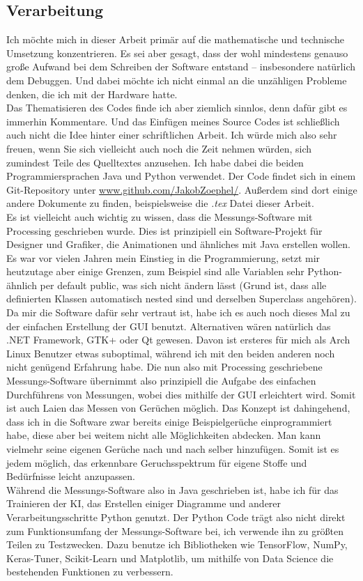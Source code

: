\documentclass[10pt]{article}
\begin{document}
\subsection{Verarbeitung}
Ich möchte mich in dieser Arbeit primär auf die mathematische und technische Umsetzung konzentrieren. Es sei aber gesagt,
dass der wohl mindestens genauso große Aufwand bei dem Schreiben der Software entstand – insbesondere natürlich dem Debuggen. 
Und dabei möchte ich nicht einmal an die unzähligen Probleme denken, die ich mit der Hardware hatte.\\
Das Thematisieren des Codes finde ich aber ziemlich sinnlos, denn dafür gibt es immerhin Kommentare. Und das Einfügen meines Source Codes ist schließlich auch
nicht die Idee hinter einer schriftlichen Arbeit. Ich würde mich also sehr freuen, wenn Sie sich vielleicht auch noch die Zeit nehmen würden, sich zumindest Teile des Quelltextes anzusehen.
Ich habe dabei die beiden Programmiersprachen Java und Python verwendet. Der Code findet sich in einem Git-Repository unter \url{www.github.com/JakobZoephel/}.
Außerdem sind dort einige andere Dokumente zu finden, beispielsweise die \textit{.tex} Datei dieser Arbeit.\\
Es ist vielleicht auch wichtig zu wissen, dass die Messungs-Software mit Processing geschrieben wurde. Dies ist prinzipiell ein Software-Projekt 
für Designer und Grafiker, die Animationen und ähnliches mit Java erstellen wollen. Es war vor vielen Jahren
mein Einstieg in die Programmierung, setzt mir heutzutage aber einige Grenzen, zum Beispiel sind alle Variablen sehr Python-ähnlich per default public, was sich nicht ändern lässt
(Grund ist, dass alle definierten Klassen automatisch nested sind und derselben Superclass angehören). 
Da mir die Software dafür sehr vertraut ist, habe ich es auch noch dieses Mal zu der einfachen
Erstellung der GUI benutzt. Alternativen wären natürlich das .NET Framework, GTK+ oder Qt gewesen. Davon ist ersteres für mich als Arch Linux Benutzer etwas suboptimal, während ich mit
den beiden anderen noch nicht genügend Erfahrung habe. Die nun also mit Processing geschriebene Messungs-Software übernimmt also prinzipiell die Aufgabe des einfachen Durchführens von Messungen, 
wobei dies mithilfe der GUI erleichtert wird. Somit ist auch Laien das Messen von Gerüchen möglich. Das Konzept ist dahingehend, dass ich in die Software
zwar bereits einige Beispielgerüche einprogrammiert habe, diese aber bei weitem nicht alle Möglichkeiten abdecken. Man kann vielmehr seine eigenen Gerüche nach und nach selber hinzufügen. 
Somit ist es jedem möglich, das erkennbare Geruchsspektrum für eigene Stoffe und Bedürfnisse leicht anzupassen.\\
Während die Messungs-Software also in Java geschrieben ist, habe ich für das Trainieren der KI, das Erstellen einiger Diagramme und anderer Verarbeitungsschritte Python genutzt.
Der Python Code trägt also nicht direkt zum Funktionsumfang der Messungs-Software bei, ich verwende ihn zu größten Teilen zu Testzwecken. Dazu benutze ich Bibliotheken
wie TensorFlow, NumPy, Keras-Tuner, Scikit-Learn und Matplotlib, um mithilfe von Data Science die bestehenden Funktionen zu verbessern.
\end{document}
